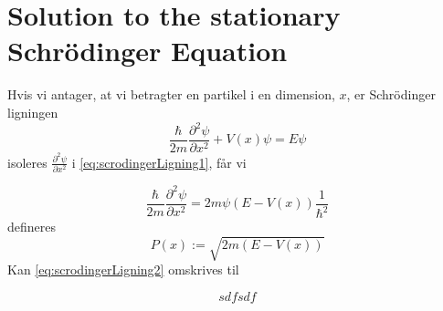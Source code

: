 \section{Solution to the stationary Schrödinger Equation}
Hvis vi antager, at vi betragter en partikel i en dimension, $x$,  er Schrödinger ligningen
\begin{equation}
    \frac{\hbar}{2m}\frac{\partial^2 \psi}{\partial x^2} + V(x) \psi = E \psi
    \label{eq:scrodingerLigning1}
\end{equation}
isoleres $\frac{\partial^2 \psi}{\partial x^2}$ i \cref{eq:scrodingerLigning1}, får vi

\begin{equation}
    \frac{\hbar}{2m}\frac{\partial^2 \psi}{\partial x^2} = 2m\psi (E  - V(x)) \frac{1}{\hbar^2}
    \label{eq:scrodingerLigning2}
\end{equation}
defineres
\begin{equation}
P(x) := \sqrt{2m(E-V(x))}
\end{equation}
Kan \cref{eq:scrodingerLigning2} omskrives til

\begin{equation}
 sdfsdf
    \label{eq:scrodingerLigning3}
\end{equation}
